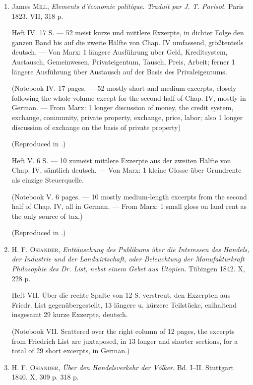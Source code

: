 \begin{enumerate}
    (Reproduced in .)
    
    \item James \textsc{Mill}, \textit{Elements d'économie politique. Traduit par J. T. Parisot}. Paris 1823. VII, 318 p.
    
    Heft IV. 17 S. --- 52 meist kurze und mittlere Exzerpte, in dichter Folge den ganzen Band bis auf die zweite Hälfte von Chap. IV umfassend, größtenteils deutsch. --- Von Marx: 1 längere Ausführung uber Geld, Kreditsystem, Austausch, Gemeinwesen, Privateigentum, Tausch, Preis, Arbeit; ferner 1 längere Ausführung über Austausch auf der Basis des Privaleigentums.
    
    (Notebook IV. 17 pages. --- 52 mostly short and medium excerpts, closely following the whole volume except for the second half of Chap. IV, mostly in German. --- From Marx: 1 longer discussion of money, the credit system, exchange, community, private property, exchange, price, labor; also 1 longer discussion of exchange on the basis of private property)
    
    (Reproduced in .)
    
    Heft V. 6 S. --- 10 zumeist mittlere Exzerpte aus der zweiten Hälfte von Chap. IV, sämtlich deutsch. --- Von Marx: 1 kleine Glosse über Grundrente als einzige Steuerquelle.
    
    (Notebook V. 6 pages. --- 10 mostly medium-length excerpts from the second half of Chap. IV, all in German. --- From Marx: 1 small gloss on land rent as the only source of tax.)
    
    (Reproduced in .)
    
    \item H. F. \textsc{Osiander}, \textit{Enttäuschung des Publikums über die Interessen des Handels, der Industrie und der Landwirtschaft, oder Beleuchtung der Manufakturkraft Philosophie des Dr. List, nebst einem Gebet aus Utopien}. Tübingen 1842. X, 228 p.
    
    Heft VII. Über die rechte Spalte von 12 S. verstreut, den Exzerpten aus Friedr. List gegenübergestellt, 13 längere u. kürzere Teilstücke, enlhaltend insgesamt 29 kurze Exzerpte, deutsch.
    
    (Notebook VII. Scattered over the right column of 12 pages, the excerpts from Friedrich List are juxtaposed, in 13 longer and shorter sections, for a total of 29 short excerpts, in German.)
    
    \item H. F. \textsc{Osiander}, \textit{Über den Handelsverkehr der Völker}. Bd. I--II. Stuttgart 1840. X, 309 p. 318 p.
    

\end{enumerate}
